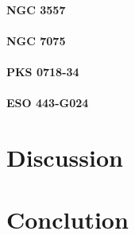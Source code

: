 \documentclass[a4paper,11pt]{article}
\begin{document}
	\paragraph{NGC 3557}

	\paragraph{NGC 7075}

	\paragraph{PKS 0718-34}

	\paragraph{ESO 443-G024}

\section{Discussion}
	\label{sec:discuss}

\section{Conclution}
	\label{sec:conc}





{}
\end{document}
